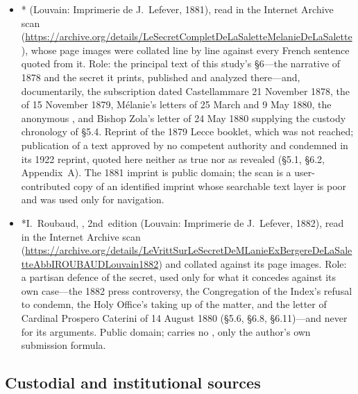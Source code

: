 \begin{itemize}
\item * (Louvain: Imprimerie de J.~Lefever, 1881), read in the
Internet Archive scan
(\url{https://archive.org/details/LeSecretCompletDeLaSaletteMelanieDeLaSalette}),
whose page images were collated line by line against every French
sentence quoted from it. Role: the principal text of this study's
\S6---the narrative of 1878 and the secret it prints, published and
analyzed there---and, documentarily, the subscription dated
Castellammare 21 November 1878, the 
of 15 November 1879, Mélanie's letters of 25 March and 9 May 1880,
the anonymous , and Bishop Zola's letter of 24
May 1880 supplying the custody chronology of \S5.4. Reprint of the
1879 Lecce booklet, which was not reached; publication of a text
approved by no competent authority and condemned in its 1922
reprint, quoted here neither as true nor as revealed (\S5.1, \S6.2,
Appendix~A). The 1881 imprint is public domain; the scan is a
user-contributed copy of an identified imprint whose searchable text
layer is poor and was used only for navigation.
\item *I.~Roubaud, , 2nd~edition (Louvain: Imprimerie de
J.~Lefever, 1882), read in the Internet Archive scan
(\url{https://archive.org/details/LeVrittSurLeSecretDeMLanieExBergereDeLaSaletteAbbIROUBAUDLouvain1882})
and collated against its page images. Role: a partisan defence of
the secret, used only for what it concedes against its own
case---the 1882 press controversy, the Congregation of the Index's
refusal to condemn, the Holy Office's taking up of the matter, and
the letter of Cardinal Prospero Caterini of 14 August 1880 (\S5.6,
\S6.8, \S6.11)---and never for its arguments. Public domain; carries
no , only the author's own submission formula.
\end{itemize}

\subsection*{Custodial and institutional sources}

